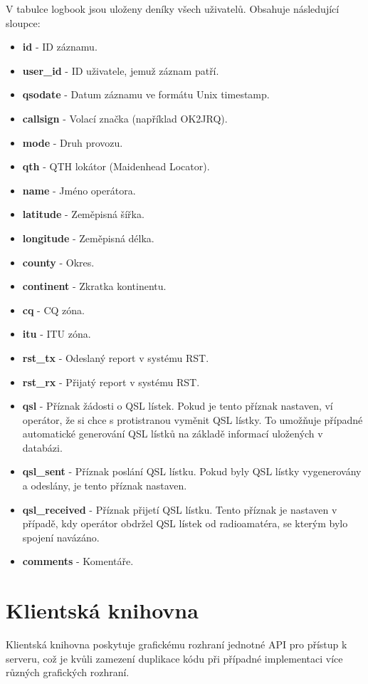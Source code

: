 V tabulce logbook jsou uloženy deníky všech uživatelů. Obsahuje následující sloupce:

\begin{itemize}
\item \textbf{id} - ID záznamu.
\item \textbf{user\_id} - ID uživatele, jemuž záznam patří.
\item \textbf{qsodate} - Datum záznamu ve formátu Unix timestamp.
\item \textbf{callsign} - Volací značka (například OK2JRQ).
\item \textbf{mode} - Druh provozu. %
\item \textbf{qth} - QTH lokátor (Maidenhead Locator).
\item \textbf{name} - Jméno operátora.
\item \textbf{latitude} - Zeměpisná šířka.
\item \textbf{longitude} - Zeměpisná délka.
\item \textbf{county} - Okres.
\item \textbf{continent} - Zkratka kontinentu.
\item \textbf{cq} - CQ zóna.
\item \textbf{itu} - ITU zóna.
\item \textbf{rst\_tx} - Odeslaný report v systému RST.
\item \textbf{rst\_rx} - Přijatý report v systému RST.
\item \textbf{qsl} - Příznak žádosti o QSL lístek. Pokud je tento příznak nastaven, ví operátor, že si chce
s protistranou vyměnit QSL lístky. To umožňuje případné automatické generování QSL lístků na základě informací
uložených v databázi.
\item \textbf{qsl\_sent} - Příznak poslání QSL lístku. Pokud byly QSL lístky vygenerovány a odeslány, je tento
příznak nastaven.
\item \textbf{qsl\_received} - Příznak přijetí QSL lístku. Tento příznak je nastaven v případě, kdy operátor
obdržel QSL lístek od radioamatéra, se kterým bylo spojení navázáno.
\item \textbf{comments} - Komentáře.
\end{itemize}

\section{Klientská knihovna}
\label{navrh_knihovna}

Klientská knihovna poskytuje grafickému rozhraní jednotné API pro přístup k
serveru, což je kvůli zamezení duplikace kódu při případné implementaci více
různých grafických rozhraní.

